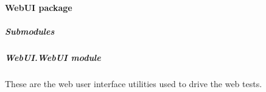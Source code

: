 \documentclass[letterpaper,10pt,english]{sphinxmanual}
\begin{document}
\begin{fulllineitems}
\label{STD/conftest:conftest.pytest_addoption}
\end{fulllineitems}


\begin{fulllineitems}
\label{STD/conftest:conftest.test_patients}
\end{fulllineitems}



\paragraph{WebUI package}
\label{STD/WebUI:webui-package}\label{STD/WebUI::doc}

\subparagraph{Submodules}
\label{STD/WebUI:submodules}

\subparagraph{WebUI.WebUI module}
\label{STD/WebUI:webui-webui-module}\label{STD/WebUI:module-WebUI.WebUI}
These are the web user interface utilities used to drive the web tests.
\end{document}
